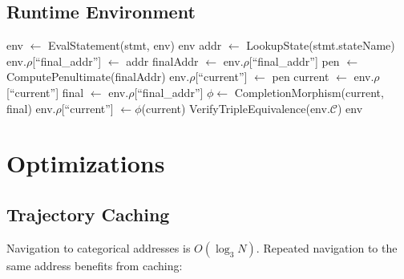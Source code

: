 \documentclass[twocolumn,10pt]{article}
\theoremstyle{definition}
\theoremstyle{remark}
\begin{document}
\subsection{Runtime Environment}

\begin{algorithm}
\caption{vaHera Runtime Evaluation}
\begin{algorithmic}[1]
        \State env $\gets$ EvalStatement(stmt, env)
    \EndFor
    \State \Return env
\EndFunction
\Statex
{}
            \State addr $\gets$ LookupState(stmt.stateName)
            \State env.$\rho$[``final\_addr''] $\gets$ addr
        \EndCase
                \State finalAddr $\gets$ env.$\rho$[``final\_addr'']
                \State pen $\gets$ ComputePenultimate(finalAddr)
                \State env.$\rho$[``current''] $\gets$ pen
            \EndIf
        \EndCase
                \State current $\gets$ env.$\rho$[``current'']
                \State final $\gets$ env.$\rho$[``final\_addr'']
                \State $\phi \gets$ CompletionMorphism(current, final)
                \State env.$\rho$[``current''] $\gets \phi$(current)
            \EndIf
        \EndCase
                \State VerifyTripleEquivalence(env.$\mathcal{C}$)
            \EndIf
        \EndCase
    \EndSwitch
    \State \Return env
\EndFunction
\end{algorithmic}
\end{algorithm}

\section{Optimizations}
\label{sec:optimization}

\subsection{Trajectory Caching}

Navigation to categorical addresses is $O(\log_3 N)$. Repeated navigation to the same address benefits from caching:
\end{document}
